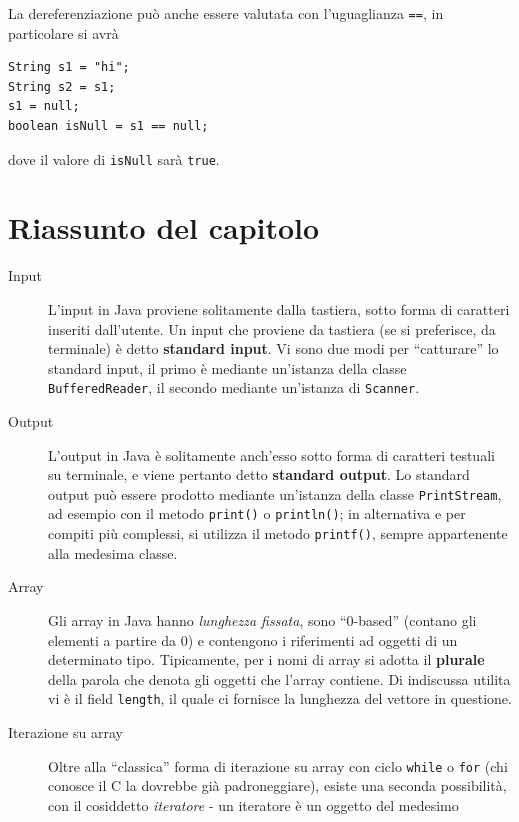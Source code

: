 \documentclass[\fontsizeclass,twocolumn]{\classname}
\theoremstyle{definition}
\theoremstyle{definition}
\begin{document}
La dereferenziazione può anche essere valutata con l'uguaglianza \texttt{==},
in particolare si avrà

\begin{lstlisting}
String s1 = "hi";
String s2 = s1;
s1 = null;
boolean isNull = s1 == null;
\end{lstlisting}

dove il valore di \texttt{isNull} sarà \texttt{true}.

\section{Riassunto del capitolo}

\begin{description}
    \item[Input] L'input in Java proviene solitamente dalla tastiera, sotto
        forma di caratteri inseriti dall'utente. Un input che proviene da
        tastiera (se si preferisce, da terminale) è detto \textbf{standard
        input}. Vi sono due modi per ``catturare'' lo standard input, il primo
        è mediante un'istanza della classe \texttt{BufferedReader}, il secondo
        mediante un'istanza di \texttt{Scanner}.
    \item[Output] L'output in Java è solitamente anch'esso sotto forma di
        caratteri testuali su terminale, e viene pertanto detto
        \textbf{standard output}. Lo standard output può essere prodotto
        mediante un'istanza della classe \texttt{PrintStream}, ad esempio con
        il metodo \texttt{print()} o \texttt{println()}; in alternativa e per
        compiti più complessi, si utilizza il metodo \texttt{printf()}, sempre
        appartenente alla medesima classe.
    \item[Array] Gli array in Java hanno \emph{lunghezza fissata}, sono
        ``0-based'' (contano gli elementi a partire da 0) e contengono i
        riferimenti ad oggetti di un determinato tipo. Tipicamente, per i nomi
        di array si adotta il \textbf{plurale} della parola che denota gli
        oggetti che l'array contiene. Di indiscussa utilita vi è il field
        \texttt{length}, il quale ci fornisce la lunghezza del vettore in
        questione.
    \item[Iterazione su array] Oltre alla ``classica'' forma di iterazione su
        array con ciclo \texttt{while} o \texttt{for} (chi conosce il C la
        dovrebbe già padroneggiare), esiste una seconda possibilità, con il
        cosiddetto \emph{iteratore} \-- un iteratore è un oggetto del medesimo

\end{description}
\end{document}
